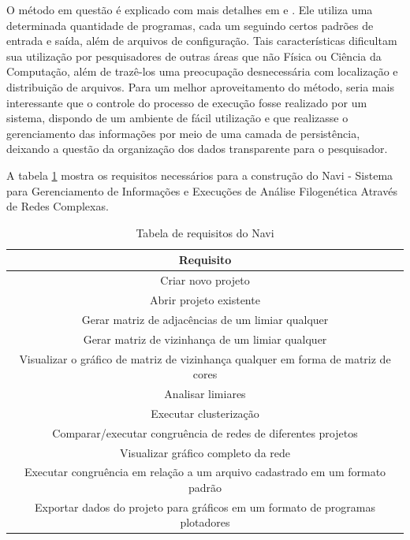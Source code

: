 O método em questão é explicado com mais detalhes em \cite{goesneto2010} e \cite{andrade2011}. Ele utiliza uma determinada quantidade de programas,
cada um seguindo certos padrões de entrada e saída, além de arquivos de configuração.
Tais características dificultam sua utilização por pesquisadores de outras áreas que não Física ou Ciência da Computação, além de trazê-los uma preocupação
desnecessária com localização e distribuição de arquivos. Para um melhor aproveitamento do método, seria mais interessante que o controle do processo de
execução fosse realizado por um sistema, dispondo de um ambiente de fácil utilização e que realizasse o gerenciamento das informações por meio de uma camada
de persistência, deixando a questão da organização dos dados transparente para o pesquisador.

A tabela \ref{tab:requisitos} mostra os requisitos necessários para a construção do Navi - Sistema para Gerenciamento de Informações e Execuções de Análise
Filogenética Através de Redes Complexas.

\begin{table}
\centering
\caption{Tabela de requisitos do Navi} %
\begin{tabular}{c} %
\hline 
Requisito \\ 
\hline
\hline
Criar novo projeto \\
Abrir projeto existente \\
Gerar matriz de adjacências de um limiar qualquer \\
Gerar matriz de vizinhança de um limiar qualquer \\
Visualizar o gráfico de matriz de vizinhança qualquer em forma de matriz de cores \\
Analisar limiares \\
Executar clusterização \\
Comparar/executar congruência de redes de diferentes projetos \\
Visualizar gráfico completo da rede \\
Executar congruência em relação a um arquivo cadastrado em um formato padrão \\
Exportar dados do projeto para gráficos em um formato de programas plotadores \\
\hline
\end{tabular}
\label{tab:requisitos}
\end{table} 


